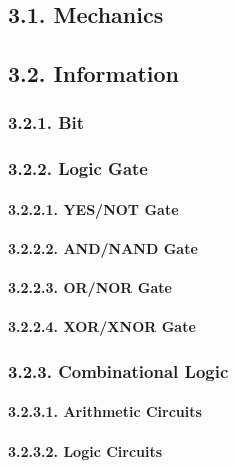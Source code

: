 \documentclass[]{article}
\let\oldparagraph\paragraph
\renewcommand{\paragraph}[1]{\oldparagraph{#1}\mbox{}}
\begin{document}
\subsection{3.1. Mechanics}\label{mechanics}

\subsection{3.2. Information}\label{information}

\subsubsection{3.2.1. Bit}\label{bit}

\subsubsection{3.2.2. Logic Gate}\label{logic-gate}

\paragraph{3.2.2.1. YES/NOT Gate}\label{yesnot-gate}

\paragraph{3.2.2.2. AND/NAND Gate}\label{andnand-gate}

\paragraph{3.2.2.3. OR/NOR Gate}\label{ornor-gate}

\paragraph{3.2.2.4. XOR/XNOR Gate}\label{xorxnor-gate}

\subsubsection{3.2.3. Combinational Logic}\label{combinational-logic}

\paragraph{3.2.3.1. Arithmetic Circuits}\label{arithmetic-circuits}

\paragraph{3.2.3.2. Logic Circuits}\label{logic-circuits}
\end{document}
